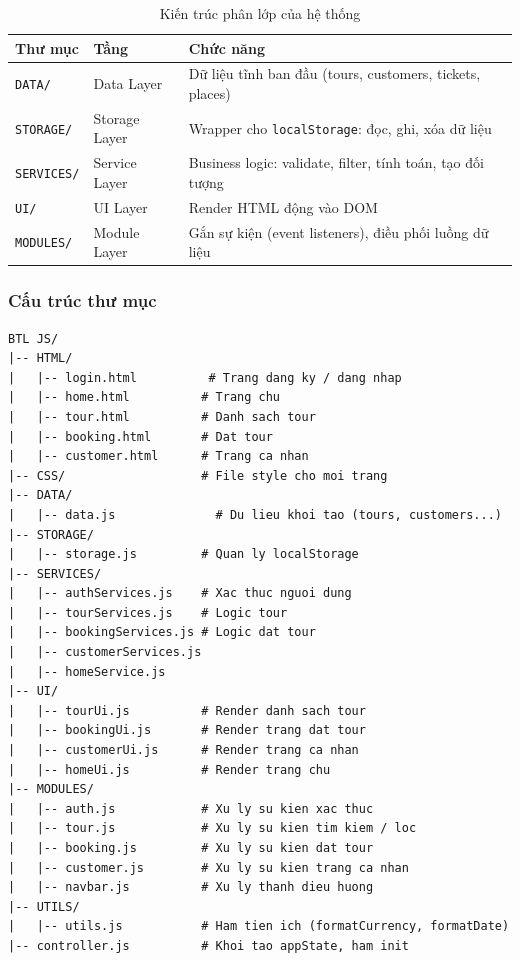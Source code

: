 \documentclass[12pt,a4paper]{article}
\begin{document}
\begin{table}[H]
\centering
\caption{Kiến trúc phân lớp của hệ thống}
\begin{tabularx}{\textwidth}{|l|l|X|}
\hline
\textbf{Thư mục} & \textbf{Tầng} & \textbf{Chức năng} \\
\hline
\texttt{DATA/}    & Data Layer    & Dữ liệu tĩnh ban đầu (tours, customers, tickets, places) \\
\hline
\texttt{STORAGE/} & Storage Layer & Wrapper cho \texttt{localStorage}: đọc, ghi, xóa dữ liệu \\
\hline
\texttt{SERVICES/}& Service Layer & Business logic: validate, filter, tính toán, tạo đối tượng \\
\hline
\texttt{UI/}      & UI Layer      & Render HTML động vào DOM \\
\hline
\texttt{MODULES/} & Module Layer  & Gắn sự kiện (event listeners), điều phối luồng dữ liệu \\
\hline
\end{tabularx}
\end{table}

\subsubsection{Cấu trúc thư mục}

\begin{lstlisting}[language={}, caption={Cây thư mục dự án}]
BTL JS/
|-- HTML/
|   |-- login.html          # Trang dang ky / dang nhap
|   |-- home.html          # Trang chu
|   |-- tour.html          # Danh sach tour
|   |-- booking.html       # Dat tour
|   |-- customer.html      # Trang ca nhan
|-- CSS/                   # File style cho moi trang
|-- DATA/
|   |-- data.js              # Du lieu khoi tao (tours, customers...)
|-- STORAGE/
|   |-- storage.js         # Quan ly localStorage
|-- SERVICES/
|   |-- authServices.js    # Xac thuc nguoi dung
|   |-- tourServices.js    # Logic tour
|   |-- bookingServices.js # Logic dat tour
|   |-- customerServices.js
|   |-- homeService.js
|-- UI/
|   |-- tourUi.js          # Render danh sach tour
|   |-- bookingUi.js       # Render trang dat tour
|   |-- customerUi.js      # Render trang ca nhan
|   |-- homeUi.js          # Render trang chu
|-- MODULES/
|   |-- auth.js            # Xu ly su kien xac thuc
|   |-- tour.js            # Xu ly su kien tim kiem / loc
|   |-- booking.js         # Xu ly su kien dat tour
|   |-- customer.js        # Xu ly su kien trang ca nhan
|   |-- navbar.js          # Xu ly thanh dieu huong
|-- UTILS/
|   |-- utils.js           # Ham tien ich (formatCurrency, formatDate)
|-- controller.js          # Khoi tao appState, ham init
\end{lstlisting}
\end{document}
